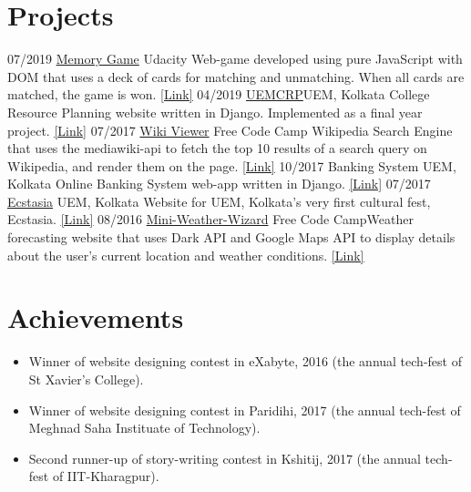 \documentclass[]{friggeri-cv}
\begin{document}
\section{Projects}
\begin{entrylist}
  \entry
    {07/2019}
    {\href{https://github.com/rafi007akhtar/fend-project-memory-game}
    {Memory Game}}
    {Udacity}
    {Web-game developed using pure JavaScript with DOM that uses a deck of cards for matching and unmatching. When all cards are matched, the game is won. \href{https://rafi007akhtar.github.io/fend-project-memory-game/}{\underline{[Link]}}}
  \entry
    {04/2019}
    {\href{https://github.com/rafi007akhtar/uemcrp}{UEMCRP}}{UEM, Kolkata}
    {College Resource Planning website written in Django. Implemented as a final year project. \href{https://github.com/rafi007akhtar/uemcrp}{\underline{[Link]}}}
  \entry
    {07/2017}
    {\href{https://github.com/rafi007akhtar/Wiki-Viewer}{Wiki Viewer}}
    {Free Code Camp}
    {Wikipedia Search Engine that uses the mediawiki-api to fetch the top 10 results of a search query on Wikipedia, and render them on the page. \href{https://rafi007akhtar.github.io/Wiki-Viewer/}{\underline{[Link]}}}
  \entry
    {10/2017}
    {Banking System}
    {UEM, Kolkata}
    {Online Banking System web-app written in Django. \href{https://github.com/rafi007akhtar/CentralBank}{\underline{[Link]}}}
  \entry
    {07/2017}
    {\href{https://github.com/rafi007akhtar/ecstasia}{Ecstasia}}
    {UEM, Kolkata}
    {Website for UEM, Kolkata's very first cultural fest, Ecstasia. \href{https://rafi007akhtar.github.io/ecstasia/}{\underline{[Link]}}}
  \entry
    {08/2016}
    {\href{https://codepen.io/rafi007akhtar/full/xrXEJE}{Mini-Weather-Wizard}}
    {Free Code Camp}{Weather forecasting website that uses Dark API and Google Maps API to display details about the user's current location and weather conditions. \href{https://codepen.io/rafi007akhtar/full/xrXEJE}{\underline{[Link]}}}
    
\end{entrylist}

\section{Achievements}
\begin{itemize}
    \item Winner of website designing contest in eXabyte, 2016 (the annual tech-fest of St Xavier's College).
    \item Winner of website designing contest in Paridihi, 2017 (the annual tech-fest of Meghnad Saha Instituate of Technology).
    \item Second runner-up of story-writing contest in Kshitij, 2017 (the annual tech-fest of IIT-Kharagpur).
\end{itemize}
\end{document}
